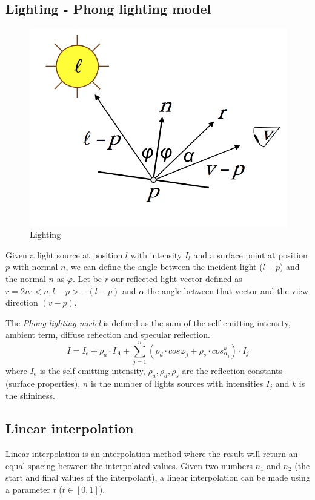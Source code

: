 
\subsection{Lighting - Phong lighting model}

\begin{figure}[h!]
  \centering
  \includegraphics[scale=0.6]{images/lighting}
\caption{Lighting \cite{SLIDE:ICORSI}}
\end{figure}
Given a light source at position $l$ with intensity $I_l$ and a surface point at position $p$ with normal $n$,
we can define the angle between the incident light ($l-p$) and the normal $n$ as $\varphi$.
Let be $r$ our reflected light vector defined as $r = 2 n \cdot <n, l - p> - (l-p)$ and $\alpha$ the angle between that vector and the view direction $(v - p)$.

The \textit{Phong lighting model} is defined as the sum of the self-emitting intensity, ambient term, diffuse reflection and specular reflection.
$$ I = I_e + {\rho}_a \cdot I_A + \sum_{j=1}^n ({\rho}_d \cdot cos {\varphi}_j + {\rho}_s \cdot cos_{\alpha_j}^k) \cdot I_j$$ where $I_e$ is the self-emitting intensity, ${\rho}_a, {\rho}_d, {\rho}_s$ are the reflection constants (surface properties), $n$ is the number of lights sources with intensities $I_j$ and $k$ is the shininess.
\cite{SLIDE:ICORSI}


\subsection{Linear interpolation}\label{section:linear-interpolation}
Linear interpolation is an interpolation method where the result will return an equal spacing between the interpolated values. Given two numbers $n_1$ and $n_2$ (the start and final values of the interpolant), a linear interpolation can be made using a parameter $t$ ($t \in [0,1]$). \cite{WEBSITE:interpolation}

